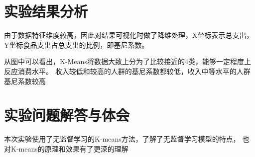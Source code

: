 \documentclass[a4paper]{ctexart}
\begin{document}
  \section{实验结果分析}
  由于数据特征维度较高，因此对结果可视化时做了降维处理，X坐标表示总支出，
  Y坐标食品支出占总支出的比例，即基尼系数。

  从图中可以看出，K-Means将数据大致上分为了比较接近的4类，能够一定程度上反应消费水平。
  收入较低和较高的人群的基尼系数都较低，收入中等水平的人群基尼系数较高

  \section{实验问题解答与体会}
  本次实验使用了无监督学习的K-means方法，了解了无监督学习模型的特点，
  也对K-means的原理和效果有了更深的理解
\end{document}

